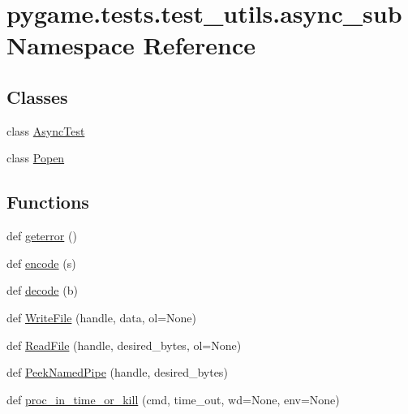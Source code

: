\hypertarget{namespacepygame_1_1tests_1_1test__utils_1_1async__sub}{}\section{pygame.\+tests.\+test\+\_\+utils.\+async\+\_\+sub Namespace Reference}
\label{namespacepygame_1_1tests_1_1test__utils_1_1async__sub}
\subsection*{Classes}
\begin{DoxyCompactItemize}
\item 
class \hyperlink{classpygame_1_1tests_1_1test__utils_1_1async__sub_1_1_async_test}{Async\+Test}
\item 
class \hyperlink{classpygame_1_1tests_1_1test__utils_1_1async__sub_1_1_popen}{Popen}
\end{DoxyCompactItemize}
\subsection*{Functions}
\begin{DoxyCompactItemize}
\item 
def \hyperlink{namespacepygame_1_1tests_1_1test__utils_1_1async__sub_a1d8bf1b902dd21aa9b903aa697eb4160}{geterror} ()
\item 
def \hyperlink{namespacepygame_1_1tests_1_1test__utils_1_1async__sub_a9120ae84a3466321d22c5e4db9f30731}{encode} (s)
\item 
def \hyperlink{namespacepygame_1_1tests_1_1test__utils_1_1async__sub_a1c41d1a52fa8f518024194f9e9d2940d}{decode} (b)
\item 
def \hyperlink{namespacepygame_1_1tests_1_1test__utils_1_1async__sub_a8b456b76ee1ef7566dd67db411974b25}{Write\+File} (handle, data, ol=None)
\item 
def \hyperlink{namespacepygame_1_1tests_1_1test__utils_1_1async__sub_a1f7e89525ba0000c654a508c7f9565e5}{Read\+File} (handle, desired\+\_\+bytes, ol=None)
\item 
def \hyperlink{namespacepygame_1_1tests_1_1test__utils_1_1async__sub_a1c939c85e9298e7c2a5e35a5aea65cae}{Peek\+Named\+Pipe} (handle, desired\+\_\+bytes)
\item 
def \hyperlink{namespacepygame_1_1tests_1_1test__utils_1_1async__sub_a73920bdef0eb017150684cb215f16eb1}{proc\+\_\+in\+\_\+time\+\_\+or\+\_\+kill} (cmd, time\+\_\+out, wd=None, env=None)
\end{DoxyCompactItemize}

